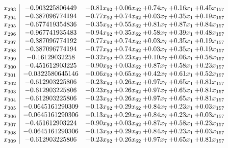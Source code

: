 \documentclass[8pt]{article}
\begin{document}
\[\begin{array}{c| c c@{\hskip 2pt} c@{\hskip 2pt} c@{\hskip 2pt} c@{\hskip 2pt} c@{\hskip 2pt} }
 x_{293}   &  -0.903225806449 & +  0.81 x_{92} & +  0.06 x_{62} & +  0.74 x_{7} & +  0.16 x_{1} & +  0.45 x_{157}\\
 x_{294}   &  -0.387096774194 & +  0.77 x_{92} & +  0.74 x_{62} & +  0.03 x_{7} & +  0.35 x_{1} & +  0.19 x_{157}\\
 x_{295}   &  -0.677419354836 & +  0.35 x_{92} & +  0.55 x_{62} & +  0.81 x_{7} & +  0.87 x_{1} & +  0.84 x_{157}\\
 x_{296}   &  -0.967741935483 & +  0.94 x_{92} & +  0.35 x_{62} & +  0.58 x_{7} & +  0.39 x_{1} & +  0.48 x_{157}\\
 x_{297}   &  -0.387096774192 & +  0.77 x_{92} & +  0.74 x_{62} & +  0.03 x_{7} & +  0.35 x_{1} & +  0.19 x_{157}\\
 x_{298}   &  -0.387096774194 & +  0.77 x_{92} & +  0.74 x_{62} & +  0.03 x_{7} & +  0.35 x_{1} & +  0.19 x_{157}\\
 x_{299}   &  -0.16129032258 & +  0.32 x_{92} & +  0.23 x_{62} & +  0.10 x_{7} & +  0.06 x_{1} & +  0.58 x_{157}\\
 x_{300}   &  -0.451612903225 & +  0.90 x_{92} & +  0.03 x_{62} & +  0.87 x_{7} & +  0.58 x_{1} & +  0.23 x_{157}\\
 x_{301}   &  -0.0322580645146 & +  0.06 x_{92} & +  0.65 x_{62} & +  0.42 x_{7} & +  0.61 x_{1} & +  0.52 x_{157}\\
 x_{302}   &  -0.612903225806 & +  0.23 x_{92} & +  0.26 x_{62} & +  0.97 x_{7} & +  0.65 x_{1} & +  0.81 x_{157}\\
 x_{303}   &  -0.612903225806 & +  0.23 x_{92} & +  0.26 x_{62} & +  0.97 x_{7} & +  0.65 x_{1} & +  0.81 x_{157}\\
 x_{304}   &  -0.612903225806 & +  0.23 x_{92} & +  0.26 x_{62} & +  0.97 x_{7} & +  0.65 x_{1} & +  0.81 x_{157}\\
 x_{305}   &  -0.0645161290309 & +  0.13 x_{92} & +  0.29 x_{62} & +  0.84 x_{7} & +  0.23 x_{1} & +  0.03 x_{157}\\
 x_{306}   &  -0.0645161290306 & +  0.13 x_{92} & +  0.29 x_{62} & +  0.84 x_{7} & +  0.23 x_{1} & +  0.03 x_{157}\\
 x_{307}   &  -0.451612903224 & +  0.90 x_{92} & +  0.03 x_{62} & +  0.87 x_{7} & +  0.58 x_{1} & +  0.23 x_{157}\\
 x_{308}   &  -0.0645161290306 & +  0.13 x_{92} & +  0.29 x_{62} & +  0.84 x_{7} & +  0.23 x_{1} & +  0.03 x_{157}\\
 x_{309}   &  -0.612903225806 & +  0.23 x_{92} & +  0.26 x_{62} & +  0.97 x_{7} & +  0.65 x_{1} & +  0.81 x_{157}\\

\end{array}\]
\end{document}
